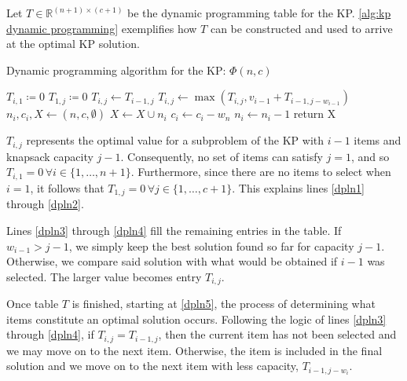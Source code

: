 Let $T \in \mathbb{R}^{(n+1) \times (c+1)}$ be the dynamic programming table for the KP. \cref{alg:kp dynamic programming} exemplifies how $T$ can be constructed and used to arrive at the optimal KP solution.

\begin{algorithm}
    \caption{Dynamic programming algorithm for the KP: $\Phi(n, c)$}
    \label{alg:kp dynamic programming}
    \begin{algorithmic}[1]
         \label{dpln1}
            \State $T_{i,1} \coloneqq 0$
        \EndFor
            \State $T_{1,j} \coloneqq 0$ \label{dpln2}
             \label{dpln3}
                \State $T_{i,j} \gets T_{i-1,j}$
                    \State $T_{i,j} \gets \max{(T_{i,j}, v_{i-1} + T_{i-1,j-w_{i-1}})}$\label{dpln4}
                \EndIf
            \EndFor
        \EndFor
        \State $n_i, c_i, X \gets (n, c, \emptyset)$
         \label{dpln5}
                \State $X \gets X \cup n_i$
                \State $c_i \gets c_i - w_n$
            \EndIf
            \State $n_i \gets n_i - 1$
        \EndWhile
        \State return X
    \end{algorithmic}
\end{algorithm}

$T_{i,j}$ represents the optimal value for a subproblem of the KP with $i - 1$ items and knapsack capacity $j - 1$. Consequently, no set of items can satisfy $j = 1$, and so $T_{i,1} = 0 \, \forall i \in \{1,\dots,n + 1\}$. Furthermore, since there are no items to select when $i = 1$, it follows that $T_{1,j} = 0 \, \forall j \in \{1,\dots,c + 1\}$. This explains lines \ref{dpln1} through \ref{dpln2}.

Lines \ref{dpln3} through \ref{dpln4} fill the remaining entries in the table. If $w_{i-1} > j - 1$, we simply keep the best solution found so far for capacity $j - 1$. Otherwise, we compare said solution with what would be obtained if $i - 1$ was selected. The larger value becomes entry $T_{i,j}$.

Once table $T$ is finished, starting at \cref{dpln5}, the process of determining what items constitute an optimal solution occurs. Following the logic of lines \ref{dpln3} through \ref{dpln4}, if $T_{i,j} = T_{i-1,j}$, then the current item has not been selected and we may move on to the next item. Otherwise, the item is included in the final solution and we move on to the next item with less capacity, $T_{i-1,j-w_i}$.

